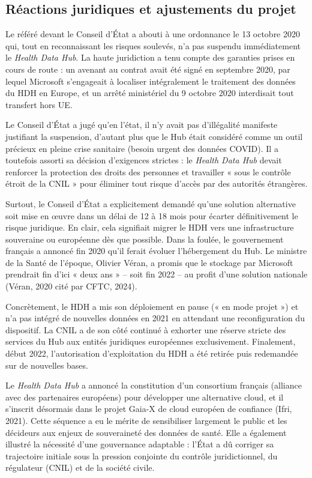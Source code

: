 \documentclass[10pt,a4paper]{article} %
\begin{document}
\subsection{Réactions juridiques et ajustements du projet}

Le référé devant le Conseil d’État a abouti à une ordonnance le 13 octobre 2020 qui, tout en reconnaissant les risques soulevés, n’a pas suspendu immédiatement le \textit{Health Data Hub}. La haute juridiction a tenu compte des garanties prises en cours de route : un avenant au contrat avait été signé en septembre 2020, par lequel Microsoft s’engageait à localiser intégralement le traitement des données du HDH en Europe, et un arrêté ministériel du 9 octobre 2020 interdisait tout transfert hors UE.

Le Conseil d’État a jugé qu’en l’état, il n’y avait pas d’illégalité manifeste justifiant la suspension, d’autant plus que le Hub était considéré comme un outil précieux en pleine crise sanitaire (besoin urgent des données COVID). Il a toutefois assorti sa décision d’exigences strictes : le \textit{Health Data Hub} devait renforcer la protection des droits des personnes et travailler « sous le contrôle étroit de la CNIL » pour éliminer tout risque d’accès par des autorités étrangères.

Surtout, le Conseil d’État a explicitement demandé qu’une solution alternative soit mise en œuvre dans un délai de 12 à 18 mois pour écarter définitivement le risque juridique. En clair, cela signifiait migrer le HDH vers une infrastructure souveraine ou européenne dès que possible. Dans la foulée, le gouvernement français a annoncé fin 2020 qu’il ferait évoluer l’hébergement du Hub. Le ministre de la Santé de l’époque, Olivier Véran, a promis que le stockage par Microsoft prendrait fin d’ici « deux ans » – soit fin 2022 – au profit d’une solution nationale (Véran, 2020 cité par CFTC, 2024).

Concrètement, le HDH a mis son déploiement en pause (« en mode projet ») et n’a pas intégré de nouvelles données en 2021 en attendant une reconfiguration du dispositif. La CNIL a de son côté continué à exhorter une réserve stricte des services du Hub aux entités juridiques européennes exclusivement. Finalement, début 2022, l’autorisation d’exploitation du HDH a été retirée puis redemandée sur de nouvelles bases.

Le \textit{Health Data Hub} a annoncé la constitution d’un consortium français (alliance avec des partenaires européens) pour développer une alternative cloud, et il s’inscrit désormais dans le projet Gaia-X de cloud européen de confiance (Ifri, 2021). Cette séquence a eu le mérite de sensibiliser largement le public et les décideurs aux enjeux de souveraineté des données de santé. Elle a également illustré la nécessité d’une gouvernance adaptable : l’État a dû corriger sa trajectoire initiale sous la pression conjointe du contrôle juridictionnel, du régulateur (CNIL) et de la société civile.
\end{document}
